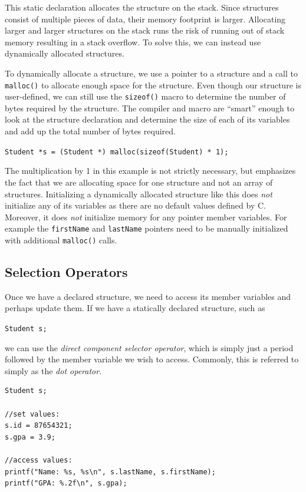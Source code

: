 This static declaration allocates the structure on the stack.
Since structures consist of multiple pieces of data, their memory 
footprint is larger.  
Allocating larger and larger structures on the stack runs the
risk of running out of stack memory resulting in a 
 stack overflow.
To solve this, we can instead use dynamically allocated structures.

To dynamically allocate a structure, we use a pointer to a structure
and a call to \texttt{malloc()} to allocate enough space
for the structure.  Even though our structure is user-defined, we
can still use the \texttt{sizeof()} macro to determine
the number of bytes required by the structure.  The compiler and
macro are ``smart'' enough to look at the structure declaration and
determine the size of each of its variables and add up the total
number of bytes required.

\texttt{Student *s = (Student *) malloc(sizeof(Student) * 1);}

The multiplication by 1 in this example is not strictly necessary, but
emphasizes the fact that we are allocating space for one structure
and not an array of structures.  Initializing a dynamically allocated
structure like this does \emph{not} initialize any of its variables
as there are no default values defined by C.  Moreover, it does 
\emph{not} initialize memory for any pointer member variables.  For
example the \texttt{firstName} and \texttt{lastName}
pointers need to be manually initialized with additional 
\texttt{malloc()} calls.

\subsection{Selection Operators}

Once we have a declared structure, we need to access its member
variables and perhaps update them.  If we have a statically declared
structure, such as

\texttt{Student s;} 

we can use the \emph{direct component selector operator}, which is
simply just a period followed by the member variable we wish to 
access.  Commonly, this is referred to simply as the 
 \emph{dot operator}.

\begin{verbatim}
Student s;

//set values:
s.id = 87654321;
s.gpa = 3.9;

//access values:
printf("Name: %s, %s\n", s.lastName, s.firstName);
printf("GPA: %.2f\n", s.gpa);
\end{verbatim}

